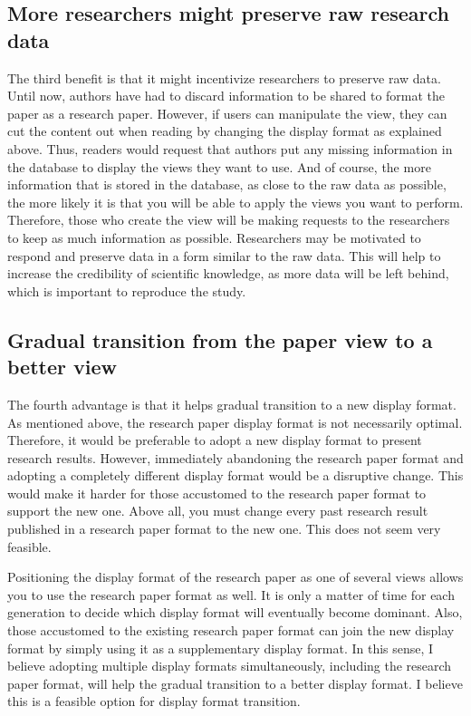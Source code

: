 \documentclass{article}
\begin{document}
\subsection{More researchers might preserve raw research data}
The third benefit is that it might incentivize researchers to preserve raw data. Until now, authors have had to discard information to be shared to format the paper as a research paper. However, if users can manipulate the view, they can cut the content out when reading by changing the display format as explained above. Thus, readers would request that authors put any missing information in the database to display the views they want to use. And of course, the more information that is stored in the database, as close to the raw data as possible, the more likely it is that you will be able to apply the views you want to perform. Therefore, those who create the view will be making requests to the researchers to keep as much information as possible. Researchers may be motivated to respond and preserve data in a form similar to the raw data. This will help to increase the credibility of scientific knowledge, as more data will be left behind, which is important to reproduce the study.

\subsection{Gradual transition from the paper view to a better view}
The fourth advantage is that it helps gradual transition to a new display format. As mentioned above, the research paper display format is not necessarily optimal. Therefore, it would be preferable to adopt a new display format to present research results. However, immediately abandoning the research paper format and adopting a completely different display format would be a disruptive change. This would make it harder for those accustomed to the research paper format to support the new one. Above all, you must change every past research result published in a research paper format to the new one. This does not seem very feasible.

Positioning the display format of the research paper as one of several views allows you to use the research paper format as well. It is only a matter of time for each generation to decide which display format will eventually become dominant. Also, those accustomed to the existing research paper format can join the new display format by simply using it as a supplementary display format. In this sense, I believe adopting multiple display formats simultaneously, including the research paper format, will help the gradual transition to a better display format. I believe this is a feasible option for display format transition.
\end{document}
